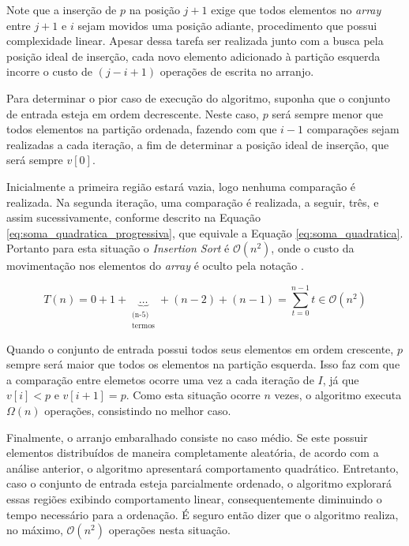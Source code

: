 \documentclass[12pt]{article}
\begin{document}
Note que a inserção de $p$ na posição $j+1$ exige que todos elementos no \textit{array} entre $j+1$ e $i$ sejam movidos uma posição adiante, procedimento que possui complexidade linear. Apesar dessa tarefa ser realizada junto com a busca pela posição ideal de inserção, cada novo elemento adicionado à partição esquerda incorre o custo de $(j-i+1)$ operações de escrita no arranjo.

Para determinar o pior caso de execução do algoritmo, suponha que o conjunto de entrada esteja em ordem decrescente. Neste caso, $p$ será sempre menor que todos elementos na partição ordenada, fazendo com que $i-1$ comparações sejam realizadas a cada iteração, a fim de determinar a posição ideal de inserção, que será sempre $v[0]$.

Inicialmente a primeira região estará vazia, logo nenhuma comparação é realizada. Na segunda iteração, uma comparação é realizada, a seguir, três, e assim sucessivamente, conforme descrito na Equação \ref{eq:soma_quadratica_progressiva}, que equivale a Equação \ref{eq:soma_quadratica}. Portanto para esta situação o \textit{Insertion Sort} é $\mathcal{O}(n^2)$, onde o custo da movimentação nos elementos do \textit{array} é oculto pela notação \cite{algorithms_redbook}.

\begin{equation}
\label{eq:soma_quadratica_progressiva}
    T(n) = 0+1+\underbrace{\ldots}_{\substack{\text{(n-5)} \\ \text{termos}}}+(n-2)+(n-1) = \sum_{t=0}^{n-1}t \in \mathcal{O}(n^2)
\end{equation}

Quando o conjunto de entrada possui todos seus elementos em ordem crescente, $p$ sempre será maior que todos os elementos na partição esquerda. Isso faz com que a comparação entre elemetos ocorre uma vez a cada iteração de $I$, já que $v[i] < p$ e $v[i+1] = p$. Como esta situação ocorre $n$ vezes, o algoritmo executa $\Omega(n)$ operações, consistindo no melhor caso.

Finalmente, o arranjo embaralhado consiste no caso médio. Se este possuir elementos distribuídos de maneira completamente aleatória, de acordo com a análise anterior, o algoritmo apresentará comportamento quadrático. Entretanto, caso o conjunto de entrada esteja parcialmente ordenado, o algoritmo explorará essas regiões exibindo comportamento linear, consequentemente diminuindo o tempo necessário para a ordenação. É seguro então dizer que o algoritmo realiza, no máximo, $\mathcal{O}(n^2)$ operações nesta situação.
\end{document}
